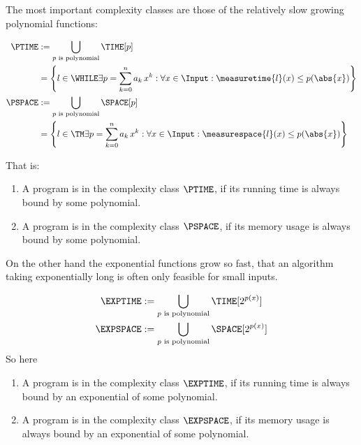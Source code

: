 The most important complexity classes are those of the relatively slow 
growing polynomial functions:

\begin{defn}
	\begin{equation*}
		\begin{split}
			\PTIME &:= \bigcup_{p\text{ is polynomial}}\TIME[p] \\
			&= \left\{l\in \WHILE \exists p=\sum^n_{k=0}a_k\,x^k: \forall x\in \Input: \measuretime{l}(x)\leq p(\abs{x})\right\}\\
			\PSPACE &:= \bigcup_{p\text{ is polynomial}}\SPACE[p] \\
			&= \left\{l\in \TM \exists p=\sum^n_{k=0}a_k\,x^k: \forall x\in \Input: \measurespace{l}(x)\leq p(\abs{x})\right\} 
		\end{split}
	\end{equation*}

	That is:
	\begin{enumerate}
		\item A program is in the complexity class $\PTIME$, if its running time is always bound 
			by some polynomial.
		\item A program is in the complexity class $\PSPACE$, if its memory usage is always bound 
			by some polynomial.
	\end{enumerate}
\end{defn}

On the other hand the exponential functions grow so fast, that an algorithm 
taking exponentially long is often only feasible for small inputs.

\begin{defn}
	\begin{equation*}
		\begin{split}
			\EXPTIME &:= \bigcup_{p\text{ is polynomial}} \TIME[2^{p(x)}]\\
			\EXPSPACE &:= \bigcup_{p\text{ is polynomial}} \SPACE[2^{p(x)}]\\
		\end{split}
	\end{equation*}
	So here
	\begin{enumerate}
		\item A program is in the complexity class $\EXPTIME$, if its running time is always bound 
			by an exponential of some polynomial.
		\item A program is in the complexity class $\EXPSPACE$, if its memory usage is always bound 
		by an exponential of some polynomial.
	\end{enumerate}
\end{defn}
